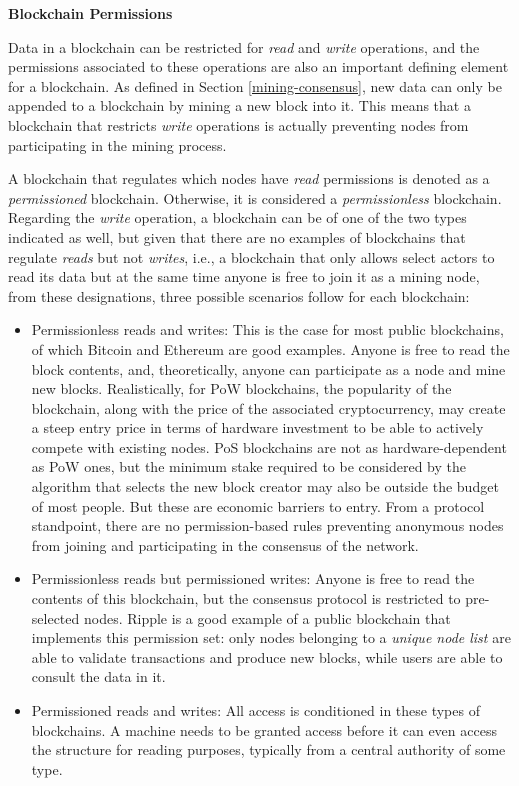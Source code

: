 \documentclass[../access.tex]{subfiles}
\begin{document}
    \par
    \textbf{Blockchain Permissions}
    \par
        Data in a blockchain can be restricted for \emph{read} and \emph{write} operations, and the permissions associated to these operations are also an important defining element for a blockchain. As defined in Section \ref{mining-consensus}, new data can only be appended to a blockchain by mining a new block into it. This means that a blockchain that restricts \emph{write} operations is actually preventing nodes from participating in the mining process.
        \par
        A blockchain that regulates which nodes have \emph{read} permissions is denoted as a \textit{permissioned} blockchain. Otherwise, it is considered a \textit{permissionless} blockchain. Regarding the \emph{write} operation, a blockchain can be of one of the two types indicated as well, but given that there are no examples of blockchains that regulate \emph{reads} but not \emph{writes}, i.e., a blockchain that only allows select actors to read its data but at the same time anyone is free to join it as a mining node, from these designations, three possible scenarios follow for each blockchain:
        \begin{itemize}
            \item{Permissionless reads and writes: This is the case for most public blockchains, of which Bitcoin and Ethereum are good examples. Anyone is free to read the block contents, and, theoretically, anyone can participate as a node and mine new blocks. Realistically, for PoW blockchains, the popularity of the blockchain, along with the price of the associated cryptocurrency, may create a steep entry price in terms of hardware investment to be able to actively compete with existing nodes. PoS blockchains are not as hardware-dependent as PoW ones, but the minimum stake required to be considered by the algorithm that selects the new block creator may also be outside the budget of most people. But these are economic barriers to entry. From a protocol standpoint, there are no permission-based rules preventing anonymous nodes from joining and participating in the consensus of the network.}

            \item{Permissionless reads but permissioned writes: Anyone is free to read the contents of this blockchain, but the consensus protocol is restricted to pre-selected nodes. Ripple is a good example of a public blockchain that implements this permission set: only nodes belonging to a \textit{unique node list} are able to validate transactions and produce new blocks, while users are able to consult the data in it.}

            \item{Permissioned reads and writes: All access is conditioned in these types of blockchains. A machine needs to be granted access before it can even access the structure for reading purposes, typically from a central authority of some type.}
        \end{itemize}
\end{document}
